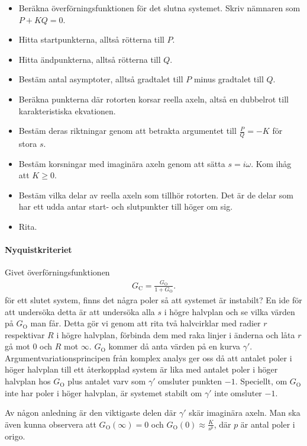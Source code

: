 \begin{itemize}
	\item Beräkna överförningsfunktionen för det slutna systemet. Skriv nämnaren som $P + KQ = 0$.
	\item Hitta startpunkterna, alltså rötterna till $P$.
	\item Hitta ändpunkterna, alltså rötterna till $Q$.
	\item Bestäm antal asymptoter, alltså gradtalet till $P$ minus gradtalet till $Q$.
	\item Beräkna punkterna där rotorten korsar reella axeln, altså en dubbelrot till karakteristiska ekvationen.
	\item Bestäm deras riktningar genom att betrakta argumentet till $\frac{P}{Q} = -K$ för stora $s$.
	\item Bestäm korsningar med imaginära axeln genom att sätta $s = i\omega$. Kom ihåg att $K\geq 0$.
	\item Bestäm vilka delar av reella axeln som tillhör rotorten. Det är de delar som har ett udda antar start- och slutpunkter till höger om sig.
	\item Rita.
\end{itemize}

\paragraph{Nyquistkriteriet}
Givet överförningsfunktionen
\begin{align*}
	G_{\text{C}} = \frac{G_{\text{O}}}{1 + G_{\text{O}}}.
\end{align*}
för ett slutet system, finns det några poler så att systemet är instabilt? En ide för att undersöka detta är att undersöka alla $s$ i högre halvplan och se vilka värden på $G_{\text{O}}$ man får. Detta gör vi genom att rita två halvcirklar med radier $r$ respektivar $R$ i högre halvplan, förbinda dem med raka linjer i änderna och låta $r$ gå mot $0$ och $R$ mot $\infty$. $G_{\text{O}}$ kommer då anta värden på en kurva $\gamma'$. Argumentvariationsprincipen från komplex analys ger oss då att antalet poler i höger halvplan till ett återkopplad system är lika med antalet poler i höger halvplan hos $G_{\text{O}}$ plus antalet varv som $\gamma'$ omsluter punkten $-1$. Speciellt, om $G_{\text{O}}$ inte har poler i höger halvplan, är systemet stabilt om $\gamma'$ inte omsluter $-1$.

Av någon anledning är den viktigaste delen där $\gamma'$ skär imaginära axeln. Man ska även kunna observera att $G_{\text{O}}(\infty) = 0$ och $G_{\text{O}}(0)\approx\frac{K}{s^{p}}$, där $p$ är antal poler i origo.